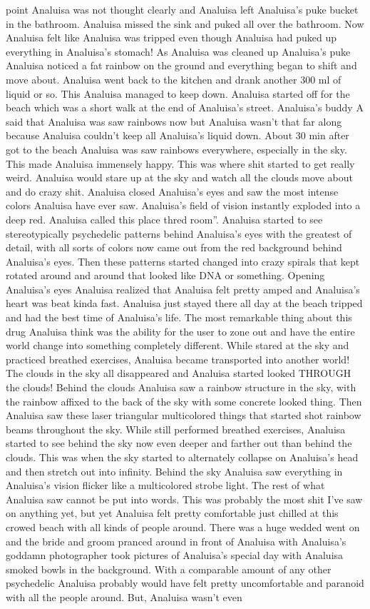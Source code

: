 \documentclass[12pt]{book}
\begin{document}
point Analuisa was not thought clearly and Analuisa left Analuisa's puke bucket in the bathroom. Analuisa missed the sink and puked all over the bathroom. Now Analuisa felt like Analuisa was tripped even though Analuisa had puked up everything in Analuisa's stomach! As Analuisa was cleaned up Analuisa's puke Analuisa noticed a fat rainbow on the ground and everything began to shift and move about. Analuisa went back to the kitchen and drank another 300 ml of liquid or so. This Analuisa managed to keep down. Analuisa started off for the beach which was a short walk at the end of Analuisa's street. Analuisa's buddy A said that Analuisa was saw rainbows now but Analuisa wasn't that far along because Analuisa couldn't keep all Analuisa's liquid down. About 30 min after got to the beach Analuisa was saw rainbows everywhere, especially in the sky. This made Analuisa immensely happy. This was where shit started to get really weird. Analuisa would stare up at the sky and watch all the clouds move about and do crazy shit. Analuisa closed Analuisa's eyes and saw the most intense colors Analuisa have ever saw. Analuisa's field of vision instantly exploded into a deep red. Analuisa called this place thred room''. Analuisa started to see stereotypically psychedelic patterns behind Analuisa's eyes with the greatest of detail, with all sorts of colors now came out from the red background behind Analuisa's eyes. Then these patterns started changed into crazy spirals that kept rotated around and around that looked like DNA or something. Opening Analuisa's eyes Analuisa realized that Analuisa felt pretty amped and Analuisa's heart was beat kinda fast. Analuisa just stayed there all day at the beach tripped and had the best time of Analuisa's life. The most remarkable thing about this drug Analuisa think was the ability for the user to zone out and have the entire world change into something completely different. While stared at the sky and practiced breathed exercises, Analuisa became transported into another world! The clouds in the sky all disappeared and Analuisa started looked THROUGH the clouds! Behind the clouds Analuisa saw a rainbow structure in the sky, with the rainbow affixed to the back of the sky with some concrete looked thing. Then Analuisa saw these laser triangular multicolored things that started shot rainbow beams throughout the sky. While still performed breathed exercises, Analuisa started to see behind the sky now even deeper and farther out than behind the clouds. This was when the sky started to alternately collapse on Analuisa's head and then stretch out into infinity. Behind the sky Analuisa saw everything in Analuisa's vision flicker like a multicolored strobe light. The rest of what Analuisa saw cannot be put into words. This was probably the most shit I've saw on anything yet, but yet Analuisa felt pretty comfortable just chilled at this crowed beach with all kinds of people around. There was a huge wedded went on and the bride and groom pranced around in front of Analuisa with Analuisa's goddamn photographer took pictures of Analuisa's special day with Analuisa smoked bowls in the background. With a comparable amount of any other psychedelic Analuisa probably would have felt pretty uncomfortable and paranoid with all the people around. But, Analuisa wasn't even 
\end{document}
